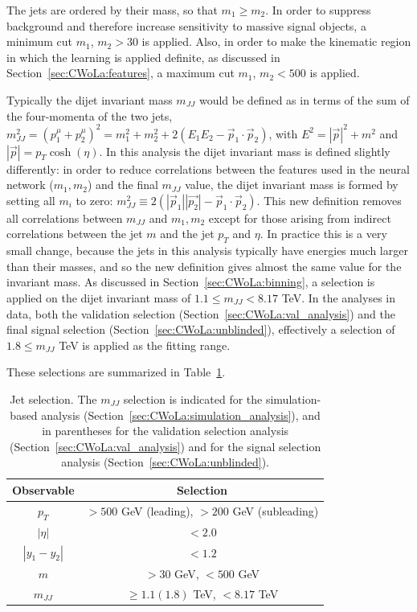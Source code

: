 The jets are ordered by their mass, so that $m_1 \ge m_2$.
In order to suppress background and therefore increase sensitivity to massive signal objects, a minimum cut $m_1$, $m_2 > 30$ \GeV{} is applied.
Also, in order to make the kinematic region in which the learning is applied definite, as discussed in Section~\ref{sec:CWoLa:features}, a maximum cut $m_1$, $m_2 < 500$ \GeV{} is applied.

Typically the dijet invariant mass $m_{JJ}$ would be defined as in terms of the sum of the four-momenta of the two jets, $m_{JJ}^2 = (p^\mu_1+p^\mu_2)^2 = m_1^2+m_2^2+2\left(E_1E_2-\vec{p}_1\cdot\vec{p}_2\right)$, with $E^2 = |\vec{p}|^2+m^2$ and $|\vec{p}| = p_T\cosh(\eta)$.
In this analysis the dijet invariant mass is defined slightly differently: in order to reduce correlations between the features used in the neural network ($m_1,m_2$) and the final $m_{JJ}$ value, the dijet invariant mass is formed by setting all $m_i$ to zero: $m_{JJ}^2 \equiv 2\left(|\vec{p}_1||\vec{p_2}|-\vec{p}_1\cdot\vec{p}_2\right)$.
This new definition removes all correlations between $m_{JJ}$ and $m_1,m_2$ except for those arising from indirect correlations between the jet $m$ and the jet $p_T$ and $\eta$.
In practice this is a very small change, because the jets in this analysis typically have energies much larger than their masses, and so the new definition gives almost the same value for the invariant mass.
As discussed in Section~\ref{sec:CWoLa:binning}, a selection is applied on the dijet invariant mass of $1.1 \le m_{JJ} < 8.17$ TeV.
In the analyses in data, both the validation selection (Section~\ref{sec:CWoLa:val_analysis}) and the final signal selection (Section~\ref{sec:CWoLa:unblinded}), effectively a selection of $1.8 \le m_{JJ}$ TeV is applied as the fitting range.

These selections are summarized in Table~\ref{tab:event_selection}.
\begin{table}[htbp]
  \begin{center}
    \caption{Jet selection. The $m_{JJ}$ selection is indicated for the simulation-based analysis (Section~\ref{sec:CWoLa:simulation_analysis}), and in parentheses for the validation selection analysis (Section~\ref{sec:CWoLa:val_analysis}) and for the signal selection analysis (Section~\ref{sec:CWoLa:unblinded}).}
  \label{tab:event_selection}
    \begin{tabular}{c c}
      \hline
      Observable & Selection \\
      \hline
      $p_T$ & $>500$ GeV (leading), $>200$ GeV (subleading) \\
      $|\eta|$ & $<2.0$ \\
      $|y_1-y_2|$ & $<1.2$ \\
      $m$ & $> 30$ GeV, $<500$ GeV \\
      $m_{JJ}$ & $\ge 1.1 (1.8)$ TeV, $<8.17$ TeV \\
      \hline
    \end{tabular}
  \end{center}
\end{table}

